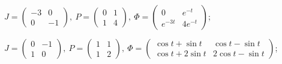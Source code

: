 \begin{enumsolsfull}
		\label{sol:linsys_hmg:transformation_mtxs}
		\item \( J = \begin{pmatrix} -3 & 0 \\ 0 & -1 \end{pmatrix}, ~ P = \begin{pmatrix} 0 & 1 \\ 1 & 4 \end{pmatrix}, ~ \Phi = \begin{pmatrix} 0 & e^{-t} \\ e^{-3t} & 4e^{-t} \end{pmatrix} \); %
		\item \( J = \begin{pmatrix} 0 & -1 \\ 1 & 0 \end{pmatrix}, ~ P = \begin{pmatrix} 1 & 1 \\ 1 & 2 \end{pmatrix}, ~ \Phi = \begin{pmatrix} \cos{t} + \sin{t} & \cos{t} - \sin{t} \\ \cos{t} + 2\sin{t} & 2\cos{t} - \sin{t} \end{pmatrix} \); %

\end{enumsolsfull}
